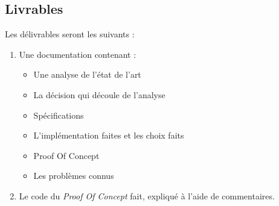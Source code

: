 \subsection*{Livrables}
Les délivrables seront les suivants :
\begin{enumerate}
\item Une documentation contenant :
	\begin{itemize}
	\item Une analyse de l'état de l'art
	\item La décision qui découle de l’analyse
	\item Spécifications
	\item L'implémentation faites et les choix faits
	\item Proof Of Concept
	\item Les problèmes connus
	\end{itemize}
\item Le code du \textit{Proof Of Concept} fait, expliqué à l'aide de commentaires.
\end{enumerate}

